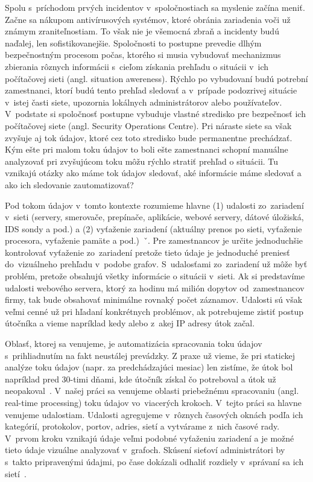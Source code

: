 \documentclass[thesismargins, thesislinespacing, openright, upjsfrontpage]{rnthesis}
\begin{document}
Spolu s~príchodom prvých incidentov v~spoločnostiach sa myslenie začína meniť. Začne sa nákupom antivírusových systémov, ktoré obránia zariadenia voči už známym zraniteľnostiam. To však nie je všemocná zbraň a incidenty budú naďalej, len sofistikovanejšie. Spoločnosti to postupne prevedie dlhým bezpečnostným procesom počas, ktorého si musia vybudovať mechanizmus zbierania rôznych informácii s~cieľom získania prehľadu o situácii v~ich počítačovej sieti (angl. situation awereness). Rýchlo po vybudovaní budú potrební zamestnanci, ktorí budú tento prehľad sledovať a v~prípade podozrivej situácie v~istej časti siete, upozornia lokálnych administrátorov alebo používateľov. V~podstate si spoločnosť postupne vybuduje vlastné stredisko pre bezpečnosť ich počítačovej siete (angl. Security Operations Centre). Pri náraste siete sa však zvyšuje aj tok údajov, ktoré cez toto stredisko bude permanentne prechádzať. Kým ešte pri malom toku údajov to boli ešte zamestnanci schopní manuálne analyzovať pri zvyšujúcom toku môžu rýchlo stratiť prehľad o situácii. Tu vznikajú otázky ako máme tok údajov sledovať, aké informácie máme sledovať a ako ich sledovanie zautomatizovať?

Pod tokom údajov v~tomto kontexte rozumieme hlavne (1) udalosti zo~zariadení v~sieti (servery, smerovače, prepínače, aplikácie, webové servery, dátové úložiská, IDS sondy a pod.) a (2) vyťaženie zariadení (aktuálny prenos po sieti, vyťaženie procesora, vyťaženie pamäte a pod.)~ˇ\cite{kent2016cyber}. Pre zamestnancov je určite jednoduchšie kontrolovať vyťaženie zo~zariadení pretože tieto údaje je jednoduché preniesť do~vizuálneho prehľadu v~podobe grafov. S~udalosťami zo~zariadení už môže byť problém, pretože obsahujú všetky informácie o situácii v~sieti. Ak si predstavíme udalosti webového servera, ktorý za hodinu má milión dopytov od~zamestnancov firmy, tak bude obsahovať minimálne rovnaký počet záznamov. Udalosti sú však veľmi cenné už pri hľadaní konkrétnych problémov, ak potrebujeme zistiť postup útočníka a vieme napríklad kedy alebo z~akej IP adresy útok začal. 

Oblasť, ktorej sa venujeme, je automatizácia spracovania toku údajov s~prihliadnutím na fakt neustálej prevádzky. Z praxe už vieme, že pri statickej analýze toku údajov (napr. za predchádzajúci mesiac) len zistíme, že útok bol napríklad pred 30-timi dňami, kde útočník získal čo potreboval a útok už neopakoval~\cite{park2010study}. V~našej práci sa venujeme oblasti priebežnému spracovaniu (angl. real-time processing) toku údajov vo~viacerých krokoch. V~tejto práci sa hlavne venujeme udalostiam. Udalosti agregujeme v~rôznych časových oknách podľa ich kategórií, protokolov, portov, adries, sietí a vytvárame z~nich časové rady. V~prvom kroku vznikajú údaje veľmi podobné vyťaženiu zariadení a je možné tieto údaje vizuálne analyzovať v~grafoch. Skúsení sieťoví administrátori by s~takto pripravenými údajmi, po čase dokázali odhaliť rozdiely v~správaní sa ich sietí~\cite{papagiannaki2005long}.
\end{document}
